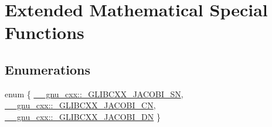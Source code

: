 \hypertarget{group__gnu__math__spec__func}{}\section{Extended Mathematical Special Functions}
\label{group__gnu__math__spec__func}
\subsection*{Enumerations}
\begin{DoxyCompactItemize}
\item 
enum \{ \hyperlink{group__gnu__math__spec__func_ggad6c62dd86a596716cece6ac2d4cfd4b3a3f3a4942031777493cbc33f592c941c7}{\+\_\+\+\_\+gnu\+\_\+cxx\+::\+\_\+\+G\+L\+I\+B\+C\+X\+X\+\_\+\+J\+A\+C\+O\+B\+I\+\_\+\+S\+N}, 
\hyperlink{group__gnu__math__spec__func_ggad6c62dd86a596716cece6ac2d4cfd4b3a86d36c2efbbbfddcfb1e552853d72d65}{\+\_\+\+\_\+gnu\+\_\+cxx\+::\+\_\+\+G\+L\+I\+B\+C\+X\+X\+\_\+\+J\+A\+C\+O\+B\+I\+\_\+\+C\+N}, 
\hyperlink{group__gnu__math__spec__func_ggad6c62dd86a596716cece6ac2d4cfd4b3a4576182edcbe93595def76dd1e61e0f7}{\+\_\+\+\_\+gnu\+\_\+cxx\+::\+\_\+\+G\+L\+I\+B\+C\+X\+X\+\_\+\+J\+A\+C\+O\+B\+I\+\_\+\+D\+N}
 \}
\end{DoxyCompactItemize}
